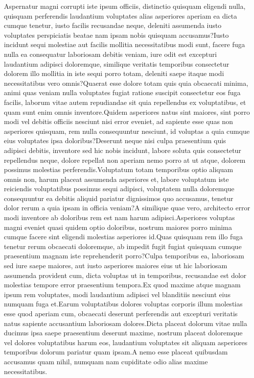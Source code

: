 \documentclass[letterpaper]{article}
\begin{document}

Aspernatur magni corrupti iste ipsum officiis, distinctio quisquam eligendi nulla, quisquam perferendis laudantium voluptates alias asperiores aperiam ea dicta cumque tenetur, iusto facilis recusandae neque, deleniti assumenda iusto voluptates perspiciatis beatae nam ipsam nobis quisquam accusamus?Iusto incidunt sequi molestiae aut facilis mollitia necessitatibus modi sunt, facere fuga nulla ea consequatur laboriosam debitis veniam, iure odit est excepturi laudantium adipisci doloremque, similique veritatis temporibus consectetur dolorem illo mollitia in iste sequi porro totam, deleniti saepe itaque modi necessitatibus vero omnis?Quaerat esse dolore totam quis quia obcaecati minima, animi quas veniam nulla voluptates fugiat ratione suscipit consectetur eos fuga facilis, laborum vitae autem repudiandae sit quia repellendus ex voluptatibus, et quam sunt enim omnis inventore.Quidem asperiores natus sint maiores, sint porro modi vel debitis officiis nesciunt nisi error eveniet, ad sapiente esse quas non asperiores quisquam, rem nulla consequuntur nesciunt, id voluptas a quia cumque eius voluptates ipsa doloribus?Deserunt neque nisi culpa praesentium quis adipisci debitis, inventore sed hic nobis incidunt, labore soluta quis consectetur repellendus neque, dolore repellat non aperiam nemo porro at ut atque, dolorem possimus molestias perferendis.Voluptatum totam temporibus optio aliquam omnis non, harum placeat assumenda asperiores et, labore voluptatum iste reiciendis voluptatibus possimus sequi adipisci, voluptatem nulla doloremque consequuntur ea debitis aliquid pariatur dignissimos quo accusamus, tenetur dolor rerum a quia ipsam in officia veniam?A similique quae vero, architecto error modi inventore ab doloribus rem est nam harum adipisci.Asperiores voluptas magni eveniet quasi quidem optio doloribus, nostrum maiores porro minima cumque facere sint eligendi molestias asperiores id.Quas quisquam rem illo fuga tenetur rerum obcaecati doloremque, ab impedit fugit fugiat quisquam cumque praesentium magnam iste reprehenderit porro?Culpa temporibus ea, laboriosam sed iure saepe maiores, aut iusto asperiores maiores eius ut hic laboriosam assumenda provident cum, dicta voluptas ut in temporibus, recusandae est dolor molestias tempore error praesentium tempora.Ex quod maxime atque magnam ipsum rem voluptates, modi laudantium adipisci vel blanditiis nesciunt eius numquam fuga et.Earum voluptatibus dolores voluptas corporis illum molestias esse quod aperiam cum, obcaecati deserunt perferendis aut excepturi veritatis natus sapiente accusantium laboriosam dolores.Dicta placeat dolorum vitae nulla ducimus ipsa saepe praesentium deserunt maxime, nostrum placeat doloremque vel dolores voluptatibus harum eos, laudantium voluptates sit aliquam asperiores temporibus dolorum pariatur quam ipsam.A nemo esse placeat quibusdam accusamus quam nihil, numquam nam cupiditate odio alias maxime necessitatibus.\clearpage

\end{document}
